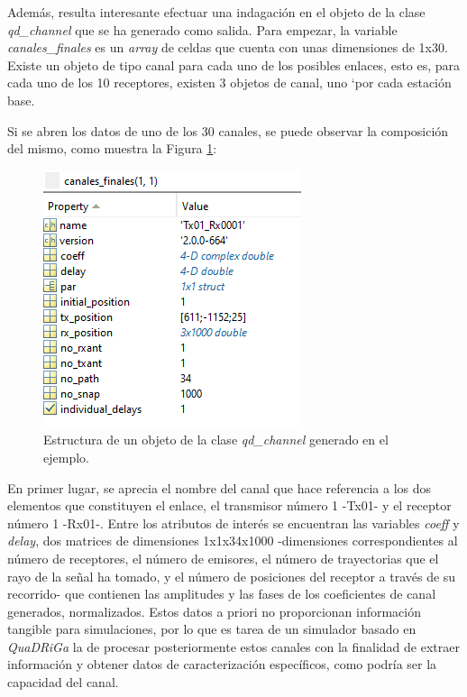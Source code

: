 Además, resulta interesante efectuar una indagación en el objeto de la clase \textit{qd\_channel} que se ha generado como salida. Para empezar, la variable \textit{canales\_finales} es un \textit{array} de celdas que cuenta con unas dimensiones de 1x30. Existe un objeto de tipo canal para cada uno de los posibles enlaces, esto es, para cada uno de los 10 receptores, existen 3 objetos de canal, uno `por cada estación base.

Si se abren los datos de uno de los 30 canales, se puede observar la composición del mismo, como muestra la Figura \ref{fig:variable_canal}:

\begin{figure}[h!]
	\centering
    \includegraphics{imagenes/canal_generado_ejemplo.PNG}
	\caption{Estructura de un objeto de la clase \textit{qd\_channel} generado en el ejemplo.}
	\label{fig:variable_canal}
\end{figure}

En primer lugar, se aprecia el nombre del canal que hace referencia a los dos elementos que constituyen el enlace, el transmisor número 1 -Tx01- y el receptor número 1 -Rx01-. Entre los atributos de interés se encuentran las variables \textit{coeff} y \textit{delay}, dos matrices de dimensiones 1x1x34x1000 -dimensiones correspondientes al número de receptores, el número de emisores, el número de trayectorias que el rayo de la señal ha tomado, y el número de posiciones del receptor a través de su recorrido- que contienen las amplitudes y las fases de los coeficientes de canal generados, normalizados. Estos datos a priori no proporcionan información tangible para simulaciones, por lo que es tarea de un simulador basado en \textit{QuaDRiGa} la de procesar posteriormente estos canales con la finalidad de extraer información y obtener datos de caracterización específicos, como podría ser la capacidad del canal.

